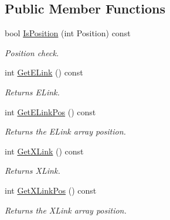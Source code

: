\subsection*{Public Member Functions}
\begin{DoxyCompactItemize}
\item 
\mbox{\label{class_t_pref_dir_element_afa529cc481e34148fd825b49dca7abdd}} 
bool \mbox{\hyperlink{class_t_pref_dir_element_afa529cc481e34148fd825b49dca7abdd}{Is\+Position}} (int Position) const
\begin{DoxyCompactList}\small\item\em Position check. \end{DoxyCompactList}\item 
\mbox{\label{class_t_pref_dir_element_af00e0755cd716b4d101abbae02c73ca2}} 
int \mbox{\hyperlink{class_t_pref_dir_element_af00e0755cd716b4d101abbae02c73ca2}{Get\+E\+Link}} () const
\begin{DoxyCompactList}\small\item\em Returns E\+Link. \end{DoxyCompactList}\item 
\mbox{\label{class_t_pref_dir_element_aa5944dedfb065d9e251c26b28fff69f6}} 
int \mbox{\hyperlink{class_t_pref_dir_element_aa5944dedfb065d9e251c26b28fff69f6}{Get\+E\+Link\+Pos}} () const
\begin{DoxyCompactList}\small\item\em Returns the E\+Link array position. \end{DoxyCompactList}\item 
\mbox{\label{class_t_pref_dir_element_a7c2e4d6a65bce13d02ec469f9ed21b64}} 
int \mbox{\hyperlink{class_t_pref_dir_element_a7c2e4d6a65bce13d02ec469f9ed21b64}{Get\+X\+Link}} () const
\begin{DoxyCompactList}\small\item\em Returns X\+Link. \end{DoxyCompactList}\item 
\mbox{\label{class_t_pref_dir_element_a35cd9c18012bd537fa988a32c510b01b}} 
int \mbox{\hyperlink{class_t_pref_dir_element_a35cd9c18012bd537fa988a32c510b01b}{Get\+X\+Link\+Pos}} () const
\begin{DoxyCompactList}\small\item\em Returns the X\+Link array position. \end{DoxyCompactList}\item 

\end{DoxyCompactItemize}
